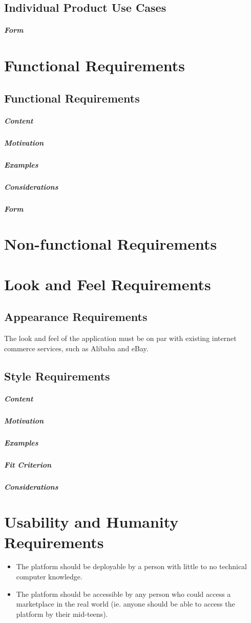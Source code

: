 \documentclass{article}
\begin{document}
\subsection{Individual Product Use Cases}
\subparagraph{Form}

\section{Functional Requirements}

\subsection{Functional Requirements}
\subparagraph{Content}
\subparagraph{Motivation}
\subparagraph{Examples}
\subparagraph{Considerations}
\subparagraph{Form}

\section*{Non-functional Requirements}

\section{Look and Feel Requirements}
\subsection{Appearance Requirements}
The look and feel of the application must be on par with existing internet commerce services, such as Alibaba and eBay. 

\subsection{Style Requirements}
\subparagraph{Content}
\subparagraph{Motivation}
\subparagraph{Examples}
\subparagraph{Fit Criterion}
\subparagraph{Considerations}

\section{Usability and Humanity Requirements}
\begin{itemize}
\item
The platform should be deployable by a person with little to no technical computer knowledge.

\item
The platform should be accessible by any person who could access a marketplace in the real world (ie. anyone should be able to access the platform by their mid-teens).
\end{itemize}
\end{document}
